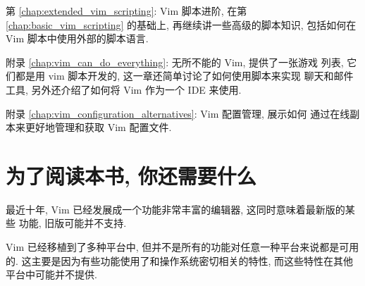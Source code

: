 第 \ref{chap:extended_vim_scripting}: Vim 脚本进阶, 在第
\ref{chap:basic_vim_scripting} 的基础上, 再继续讲一些高级的脚本知识,
包括如何在 Vim 脚本中使用外部的脚本语言.

附录 \ref{chap:vim_can_do_everything}: 无所不能的 Vim, 提供了一张游戏
列表, 它们都是用 vim 脚本开发的, 这一章还简单讨论了如何使用脚本来实现
聊天和邮件工具, 另外还介绍了如何将 Vim 作为一个 IDE 来使用.

附录 \ref{chap:vim_configuration_alternatives}: Vim 配置管理, 展示如何
通过在线副本来更好地管理和获取 Vim 配置文件.

\section*{为了阅读本书, 你还需要什么}
最近十年, Vim 已经发展成一个功能非常丰富的编辑器, 这同时意味着最新版的某些
功能, 旧版可能并不支持.

Vim 已经移植到了多种平台中, 但并不是所有的功能对任意一种平台来说都是可用
的. 这主要是因为有些功能使用了和操作系统密切相关的特性, 而这些特性在其他
平台中可能并不提供.
